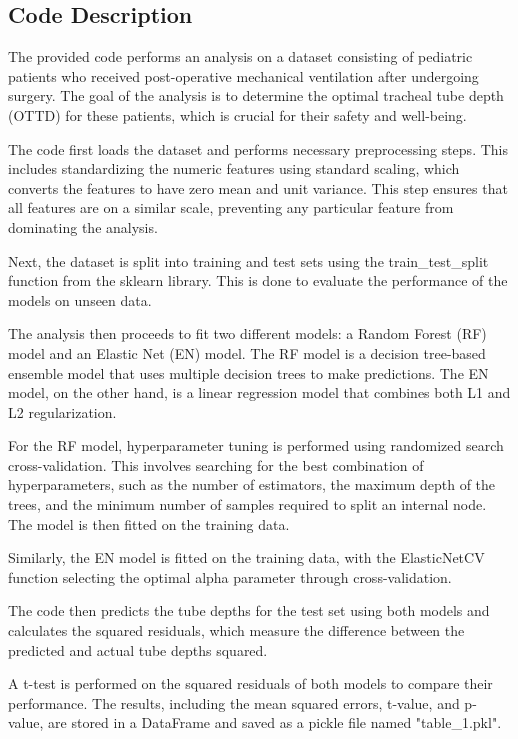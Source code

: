 \documentclass[11pt]{article}
\begin{document}
\subsection{Code Description}

The provided code performs an analysis on a dataset consisting of pediatric patients who received post-operative mechanical ventilation after undergoing surgery. The goal of the analysis is to determine the optimal tracheal tube depth (OTTD) for these patients, which is crucial for their safety and well-being.

The code first loads the dataset and performs necessary preprocessing steps. This includes standardizing the numeric features using standard scaling, which converts the features to have zero mean and unit variance. This step ensures that all features are on a similar scale, preventing any particular feature from dominating the analysis.

Next, the dataset is split into training and test sets using the train\_test\_split function from the sklearn library. This is done to evaluate the performance of the models on unseen data.

The analysis then proceeds to fit two different models: a Random Forest (RF) model and an Elastic Net (EN) model. The RF model is a decision tree-based ensemble model that uses multiple decision trees to make predictions. The EN model, on the other hand, is a linear regression model that combines both L1 and L2 regularization.

For the RF model, hyperparameter tuning is performed using randomized search cross-validation. This involves searching for the best combination of hyperparameters, such as the number of estimators, the maximum depth of the trees, and the minimum number of samples required to split an internal node. The model is then fitted on the training data.

Similarly, the EN model is fitted on the training data, with the ElasticNetCV function selecting the optimal alpha parameter through cross-validation.

The code then predicts the tube depths for the test set using both models and calculates the squared residuals, which measure the difference between the predicted and actual tube depths squared.

A t-test is performed on the squared residuals of both models to compare their performance. The results, including the mean squared errors, t-value, and p-value, are stored in a DataFrame and saved as a pickle file named "table\_1.pkl".
\end{document}
